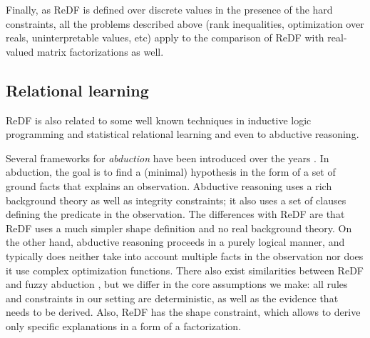 Finally, as ReDF is defined over discrete values in the presence of the hard constraints, all the problems described above (rank inequalities, optimization over reals, uninterpretable values, etc) apply to the comparison of ReDF with real-valued matrix factorizations as well.\changese



\subsection{Relational learning}
ReDF is also related to some well known techniques in inductive logic programming and statistical relational learning
and even to abductive reasoning. 

Several frameworks for {\em abduction} have been introduced over the years \parencite{abduction,abductioninduction}. 
In abduction, the goal is to find a (minimal) hypothesis in the form
of a set of ground facts that explains an observation. Abductive reasoning uses
a rich background theory as well as integrity constraints; it also uses
a set of clauses defining the predicate in the observation. The differences with ReDF are that 
ReDF uses a much simpler shape definition and no real background theory. On the other hand, abductive reasoning
proceeds in a purely logical manner, and typically does neither take into account multiple facts in the observation nor does it use complex optimization functions.  
There also exist similarities between ReDF and fuzzy abduction \parencite{fuzzylogicabduction,fuzzystudy}, but we differ in the core assumptions we make: all rules and constraints in our setting are deterministic, as well as the evidence that needs to be derived. Also, ReDF has the shape constraint, which allows to derive only specific explanations in a form of a factorization.


